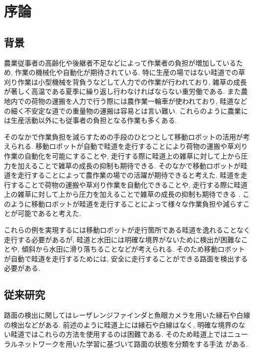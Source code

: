 \chapter{序論}
\section{背景}
農業従事者の高齢化や後継者不足などによって作業者の負担が増加しているため, 作業の機械化や自動化が期待されている. 
特に生産の場ではない畦道での草刈り作業は小型機械を背負うなどして人力での作業が行われており, 雑草の成長が著しく高温である夏季に繰り返し行わなければならない重労働である. 
また農地内での荷物の運搬を人力で行う際には農作業一輪車が使われており, 畦道などの細く不安定な道での重量物の運搬は容易とは言い難い. 
これらのように農業には生産活動以外にも従事者の負担となる作業も多くある.  

そのなかで作業負担を減らすための手段のひとつとして移動ロボットの活用が考えられる. 
移動ロボットが自動で畦道を走行することにより荷物の運搬や草刈り作業の自動化を可能にすることや, 
走行する際に畦道上の雑草に対して上から圧力を加えることで雑草の成長の抑制も期待できる\cite{稲垣栄洋2017踏圧処理が畦畔雑草植生に及ぼす影響}. 
そのなかで移動ロボットが畦道を走行することによって農作業の場での活躍が期待できると考えた. 
畦道を走行することで荷物の運搬や草刈り作業を自動化できることや, 走行する際に畦道上の雑草に対して上から圧力を加えることで雑草の成長の抑制も期待できる\cite{長橋孝哉2019ニューラルネットワークを用いた畦道の雑草検出に関する研究}
. 
このように移動ロボットが畦道を走行することによって様々な作業負担や減らすことが可能であると考えた. 

これらの例を実現するには移動ロボットが走行箇所である畦道を逸れることなく走行する必要があるが, 
畦道と水田には明確な境界がないために検出が困難なことや, 傾斜から水田に滑り落ちることなどが考えられる. 
そのため移動ロボットが自動で畦道を走行するためには, 安全に走行することができる路面を検出する必要がある.
\section{従来研究}
路面の検出に関してはレーザレンジファインダと魚眼カメラを用いた縁石や白線の検出\cite{土谷千加夫2015自律走行のための白線と縁石に基づく自己位置推定}などがある. 
前述のように畦道上には縁石や白線はなく, 明確な境界のない畦道ではこれらの方法を使用するのは困難である. 
そのため畦道上ではニューラルネットワークを用いた学習に基づいて路面の状態を分類をする手法
\cite{長橋孝哉2019ニューラルネットワークを用いた畦道の雑草検出に関する研究}がある.

